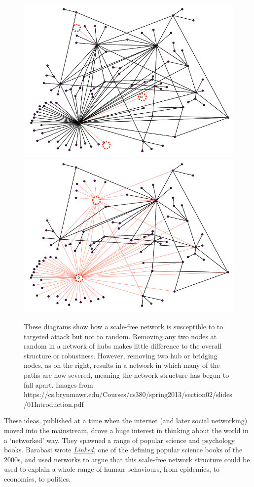 \documentclass[
]{book}
\begin{document}
\begin{figure}

{\centering \includegraphics[width=0.49\linewidth,height=0.2\textheight]{images/Screenshot 2022-10-03 at 12.07.50} \includegraphics[width=0.49\linewidth,height=0.2\textheight]{images/Screenshot 2022-10-03 at 12.07.55} 

}

\caption{These diagrams show how a scale-free network is susceptible to to targeted attack but not to random. Removing any two nodes at random in a network of hubs makes little difference to the overall structure or robustness. However, removing two hub or bridging nodes, as on the right, results in a network in which many of the paths are now severed, meaning the network structure has begun to fall apart. Images from https://cs.brynmawr.edu/Courses/cs380/spring2013/section02/slides/01Introduction.pdf}\label{fig:unnamed-chunk-4}
\end{figure}

These ideas, published at a time when the internet (and later social networking) moved into the mainstream, drove a huge interest in thinking about the world in a `networked' way. They spawned a range of popular science and psychology books. Barabasi wrote \href{https://en.wikipedia.org/wiki/Linked:_The_New_Science_of_Networks}{\emph{Linked}}\emph{,} one of the defining popular science books of the 2000s, and used networks to argue that this scale-free network structure could be used to explain a whole range of human behaviours, from epidemics, to economics, to politics.
\end{document}
